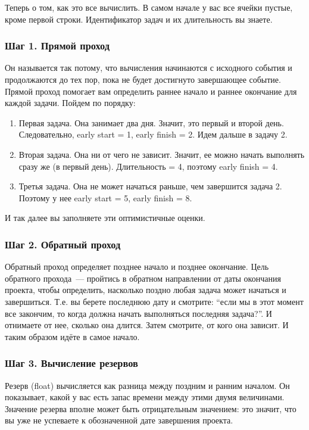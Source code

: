\documentclass{../../text-style}
\begin{document}
Теперь о том, как это все вычислить. В самом начале у вас все ячейки пустые, кроме первой строки. Идентификатор задач и их длительность вы знаете.

\subsubsection{Шаг 1. Прямой проход}

Он называется так потому, что вычисления начинаются с исходного события и продолжаются до тех пор, пока не будет достигнуто завершающее событие. Прямой проход помогает вам определить раннее начало и раннее окончание для каждой задачи. Пойдем по порядку:

\begin{enumerate}
    \item Первая задача. Она занимает два дня. Значит, это первый и второй день. Следовательно, early start = 1, early finish = 2. Идем дальше в задачу 2.
    \item Вторая задача. Она ни от чего не зависит. Значит, ее можно начать выполнять сразу же (в первый день). Длительность = 4, поэтому early finish = 4.
    \item Третья задача. Она не может начаться раньше, чем завершится задача 2. Поэтому у нее early start = 5, early finish = 8.
\end{enumerate}

И так далее вы заполняете эти оптимистичные оценки.

\subsubsection{Шаг 2. Обратный проход}

Обратный проход  определяет позднее начало и позднее окончание. Цель обратного прохода~--- пройтись в обратном направлении от даты окончания проекта, чтобы определить, насколько поздно любая задача может начаться и завершиться. Т.е. вы берете последнюю дату и смотрите: \enquote{если мы в этот момент все закончим, то когда должна начать выполняться последняя задача?}. И отнимаете от нее, сколько она длится. Затем смотрите, от кого она зависит. И таким образом идёте в самое начало. 

\subsubsection{Шаг 3. Вычисление резервов}

Резерв (float) вычисляется как разница между поздним и ранним началом. Он показывает, какой у вас есть запас времени между этими двумя величинами. Значение резерва вполне может быть отрицательным значением: это значит, что вы уже не успеваете к обозначенной дате завершения проекта.
\end{document}
